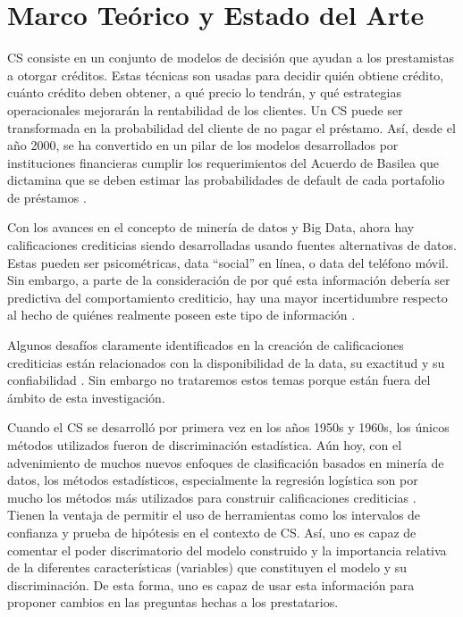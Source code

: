 \chapter{Marco Teórico y Estado del Arte}

\ac{CS} consiste en un conjunto de modelos de decisión que ayudan a los prestamistas a otorgar créditos. Estas técnicas son usadas para decidir quién obtiene crédito, cuánto crédito deben obtener, a qué precio lo tendrán, y qué estrategias operacionales mejorarán la rentabilidad de los clientes. Un \ac{CS} puede ser transformada en la probabilidad del cliente de no pagar el préstamo. Así, desde el año 2000, se ha convertido en un pilar de los modelos desarrollados por instituciones financieras cumplir los requerimientos del Acuerdo de Basilea que dictamina que se deben estimar las probabilidades de default de cada portafolio de préstamos \cite[1]{thomas2017credit}.

Con los avances en el concepto de minería de datos y Big Data, ahora hay calificaciones crediticias siendo desarrolladas usando fuentes alternativas de datos. Estas pueden ser psicométricas, data ``social'' en línea, o data del teléfono móvil. Sin embargo, a parte de la consideración de por qué esta información debería ser predictiva del comportamiento crediticio, hay una mayor incertidumbre respecto al hecho de quiénes realmente poseen este tipo de información \cite[18]{thomas2017credit}.

Algunos desafíos claramente identificados en la creación de calificaciones crediticias están relacionados con la disponibilidad de la data, su exactitud y su confiabilidad \cite[18--19]{thomas2017credit}. Sin embargo no trataremos estos temas porque están fuera del ámbito de esta investigación.

Cuando el \ac{CS} se desarrolló por primera vez en los años 1950s y 1960s, los únicos métodos utilizados fueron de discriminación estadística. Aún hoy, con el advenimiento de muchos nuevos enfoques de clasificación basados en minería de datos, los métodos estadísticos, especialmente la regresión logística son por mucho los métodos más utilizados para construir calificaciones crediticias \cite[25]{thomas2017credit}. Tienen la ventaja de permitir el uso de herramientas como los intervalos de confianza y prueba de hipótesis en el contexto de \ac{CS}. Así, uno es capaz de comentar el poder discrimatorio del modelo construido y la importancia relativa de la diferentes características (variables) que constituyen el modelo y su discriminación. De esta forma, uno es capaz de usar esta información para proponer cambios en las preguntas hechas a los prestatarios.

